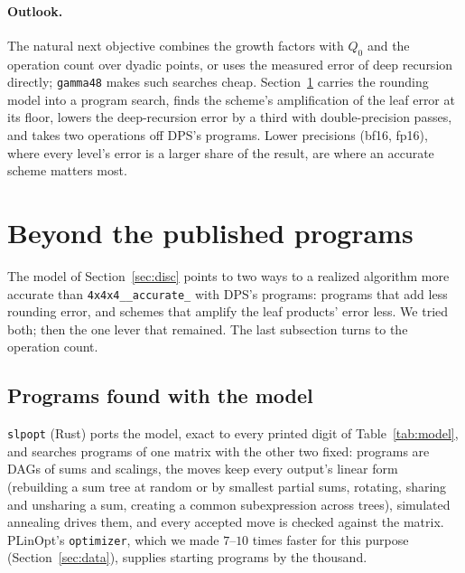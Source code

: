 \documentclass[11pt]{article}
\theoremstyle{remark}
\newcommand{\acct}{\texttt{4x4x4\_\allowbreak 48\_\allowbreak accurate\_\allowbreak 262}\xspace}
\begin{document}
\paragraph{Outlook.}
The natural next objective combines the growth factors with $Q_0$ and
the operation count over dyadic points, or uses the measured error of
deep recursion directly; \texttt{gamma48} makes such searches cheap.
Section~\ref{sec:beyond} carries the rounding model into a program
search, finds the scheme's amplification of the leaf error at its
floor, lowers the deep-recursion error by a third with double-precision
passes, and takes two operations off DPS's programs.  Lower precisions (bf16, fp16), where every
level's error is a larger share of the result, are where an accurate
scheme matters most.

\section{Beyond the published programs}\label{sec:beyond}

The model of Section~\ref{sec:disc} points to two ways to a realized
algorithm more accurate than \acct with DPS's programs: programs that add
less rounding error, and schemes that amplify the leaf products' error
less.  We tried both; then the one lever that remained.  The last
subsection turns to the operation count.

\subsection{Programs found with the model}\label{sec:searchprog}

\texttt{slpopt} (Rust) ports the model, exact to every printed digit of
Table~\ref{tab:model}, and searches programs of one matrix with the other
two fixed: programs are DAGs of sums and scalings, the moves keep every
output's linear form (rebuilding a sum tree at random or by smallest
partial sums, rotating, sharing and unsharing a sum, creating a common
subexpression across trees), simulated annealing drives them, and every
accepted move is checked against the matrix.  PLinOpt's
\texttt{optimizer}, which we made $7$--$10$ times faster for this
purpose (Section~\ref{sec:data}), supplies starting programs by the
thousand.
\end{document}
